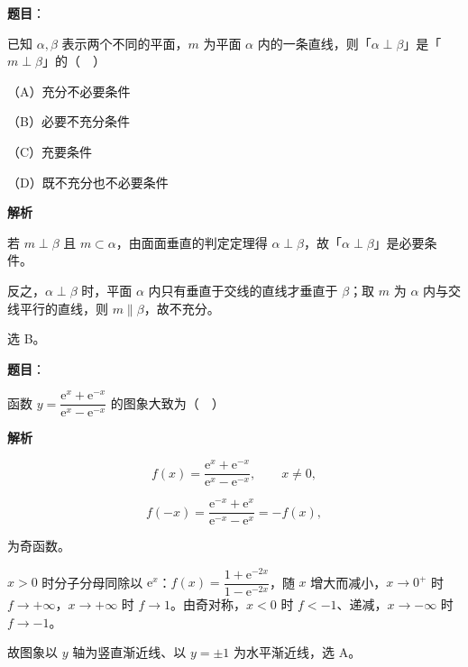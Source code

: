 \begin{answer}

\textbf{题目}：

已知 $\alpha,\beta$ 表示两个不同的平面，$m$ 为平面 $\alpha$ 内的一条直线，则「$\alpha\perp\beta$」是「$m\perp\beta$」的（　）

（A）充分不必要条件

（B）必要不充分条件

（C）充要条件

（D）既不充分也不必要条件

\textbf{解析}

若 $m\perp\beta$ 且 $m\subset\alpha$，由面面垂直的判定定理得 $\alpha\perp\beta$，故「$\alpha\perp\beta$」是必要条件。

反之，$\alpha\perp\beta$ 时，平面 $\alpha$ 内只有垂直于交线的直线才垂直于 $\beta$；取 $m$ 为 $\alpha$ 内与交线平行的直线，则 $m\parallel\beta$，故不充分。

选 B。


\end{answer}
\begin{answer}

\textbf{题目}：

函数 $y=\dfrac{\mathrm e^x+\mathrm e^{-x}}{\mathrm e^x-\mathrm e^{-x}}$ 的图象大致为（　）
\nopagebreak[4]
\begin{center}\end{center}
\nopagebreak[4]
\textbf{解析}

\nopagebreak[4]
\[f(x)=\frac{\mathrm e^x+\mathrm e^{-x}}{\mathrm e^x-\mathrm e^{-x}},\qquad x\neq0,\]

\nopagebreak[4]
\[f(-x)=\frac{\mathrm e^{-x}+\mathrm e^{x}}{\mathrm e^{-x}-\mathrm e^{x}}=-f(x),\]

为奇函数。

$x>0$ 时分子分母同除以 $\mathrm e^x$：$f(x)=\dfrac{1+\mathrm e^{-2x}}{1-\mathrm e^{-2x}}$，随 $x$ 增大而减小，$x\to0^+$ 时 $f\to+\infty$，$x\to+\infty$ 时 $f\to1$。由奇对称，$x<0$ 时 $f<-1$、递减，$x\to-\infty$ 时 $f\to-1$。

故图象以 $y$ 轴为竖直渐近线、以 $y=\pm1$ 为水平渐近线，选 A。


\end{answer}
